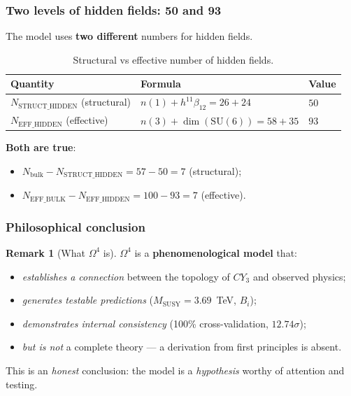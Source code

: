 \documentclass[11pt,a4paper]{article}
\newcommand{\SU}{\ensuremath{\mathrm{SU}}}
\newcommand{\CY}{\ensuremath{CY_3}}
\newcommand{\Om}{\ensuremath{\Omega^4}}
\theoremstyle{definition}
\newtheorem{remark}[theorem]{Remark}
\begin{document}
\subsubsection{Two levels of hidden fields: 50 and 93}

The model uses \textbf{two different} numbers for hidden fields.

\begin{table}[ht]
\centering
\caption{Structural vs effective number of hidden fields.}
\label{tab:two-hidden-numbers}
\begin{tabular}{lll}
\toprule
Quantity & Formula & Value \\
\midrule
$N_{\text{STRUCT\_HIDDEN}}$ (structural) & $n(1) + h^{11}\beta_{12} = 26 + 24$ & $50$ \\
$N_{\text{EFF\_HIDDEN}}$ (effective) & $n(3) + \dim(\SU(6)) = 58 + 35$ & $93$ \\
\bottomrule
\end{tabular}
\end{table}

\noindent
\textbf{Both are true}:
\begin{itemize}
    \item $N_{\text{bulk}} - N_{\text{STRUCT\_HIDDEN}} = 57 - 50 = 7$ (structural);
    \item $N_{\text{EFF\_BULK}} - N_{\text{EFF\_HIDDEN}} = 100 - 93 = 7$ (effective).
\end{itemize}
                                  

\subsubsection{Philosophical conclusion}

\begin{remark}[What $\Om$ is]
\label{rem:what-is-omega4}
$\Om$ is a \textbf{phenomenological model} that:
\begin{itemize}
    \item \emph{establishes a connection} between the topology of $\CY$
          and observed physics;
    \item \emph{generates testable predictions}
          ($M_{\text{SUSY}} = 3.69$~TeV, $B_i$);
    \item \emph{demonstrates internal consistency}
          (100\% cross-validation, $12.74\sigma$);
    \item \emph{but is not} a complete theory ---
          a derivation from first principles is absent.
\end{itemize}
This is an \emph{honest} conclusion: the model is a \emph{hypothesis}
worthy of attention and testing.
\end{remark}
\end{document}
